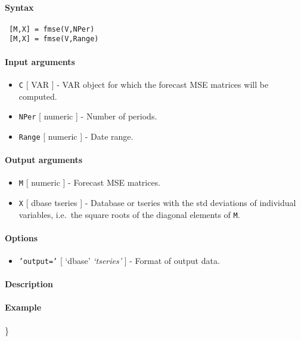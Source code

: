 


	\paragraph{Syntax}
 
 \begin{verbatim}
 [M,X] = fmse(V,NPer)
 [M,X] = fmse(V,Range)
 \end{verbatim}
 
 \paragraph{Input arguments}
 
 \begin{itemize}
 \item
   \texttt{C} {[} VAR {]} - VAR object for which the forecast MSE
   matrices will be computed.
 \item
   \texttt{NPer} {[} numeric {]} - Number of periods.
 \item
   \texttt{Range} {[} numeric {]} - Date range.
 \end{itemize}
 
 \paragraph{Output arguments}
 
 \begin{itemize}
 \item
   \texttt{M} {[} numeric {]} - Forecast MSE matrices.
 \item
   \texttt{X} {[} dbase \textbar{} tseries {]} - Database or tseries with
   the std deviations of individual variables, i.e.~the square roots of
   the diagonal elements of \texttt{M}.
 \end{itemize}
 
 \paragraph{Options}
 
 \begin{itemize}
 \item
   \texttt{'output='} {[} `dbase' \textbar{} \emph{`tseries'} {]} -
   Format of output data.
 \end{itemize}
 
 \paragraph{Description}
 
 \paragraph{Example}
 
 \}


